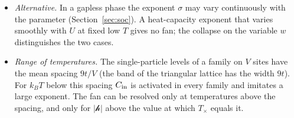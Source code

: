\documentclass[10pt,a4paper]{article}
\theoremstyle{plain}
\newcommand{\hfield}{\mathscr{h}}  %
\begin{document}
\begin{itemize}
  $|U-U_{\rm QCP}|$, and the two measured exponents $q_\pm$ determine $b$
  twice. If one phase has a gap, the gap is a function of $w$ times $k_BT$
  and vanishes as $|\hfield|^{(1-\sigma)/b}$. A change of the exponent at
  $U_{\rm QCP}$ with amplitudes that do not depend on $U$ is not of the
  form~\eqref{eq:filt_scalingform}.
\item \emph{Alternative.} In a gapless phase the exponent $\sigma$ may vary
  continuously with the parameter (Section~\ref{sec:soc}). A heat-capacity
  exponent that varies smoothly with $U$ at fixed low $T$ gives no fan; the
  collapse on the variable $w$ distinguishes the two cases.
\item \emph{Range of temperatures.} The single-particle levels of a family
  on $V$ sites have the mean spacing $9t/V$ (the band of the triangular
  lattice has the width $9t$). For $k_BT$ below this spacing $C_{\rm in}$ is
  activated in every family and imitates a large exponent. The fan can be
  resolved only at temperatures above the spacing, and only for
  $|\hfield|$ above the value at which $T_\times$ equals it.
\end{itemize}
\end{document}
